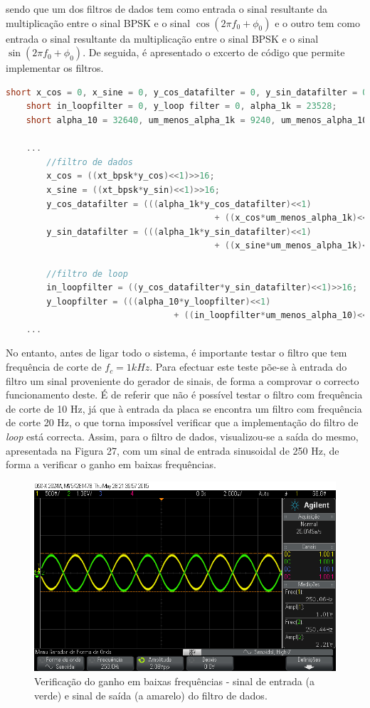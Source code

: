 \documentclass[11pt]{article}
\numberwithin{equation}{section}
\begin{document}
\vspace{1mm}
sendo que um dos filtros de dados tem como entrada o sinal resultante da multiplicação entre o sinal BPSK e o sinal $\cos(2\pi f_0 + \phi_0)$ e o outro tem como entrada o sinal resultante da multiplicação entre o sinal BPSK e o sinal $\sin(2\pi f_0 + \phi_0)$. De seguida, é apresentado o excerto de código que permite implementar os filtros. 

\begin{lstlisting}[language=C]
	short x_cos = 0, x_sine = 0, y_cos_datafilter = 0, y_sin_datafilter = 0;  
	short in_loopfilter = 0, y_loop filter = 0, alpha_1k = 23528; 
	short alpha_10 = 32640, um_menos_alpha_1k = 9240, um_menos_alpha_10 = 127;

	...
		//filtro de dados
		x_cos = ((xt_bpsk*y_cos)<<1)>>16;
		x_sine = ((xt_bpsk*y_sin)<<1)>>16;
		y_cos_datafilter = (((alpha_1k*y_cos_datafilter)<<1)
										 + ((x_cos*um_menos_alpha_1k)<<1))>>16;
		y_sin_datafilter = (((alpha_1k*y_sin_datafilter)<<1)
										 + ((x_sine*um_menos_alpha_1k)<<1))>>16;
	
		//filtro de loop
		in_loopfilter = ((y_cos_datafilter*y_sin_datafilter)<<1)>>16;
		y_loopfilter = (((alpha_10*y_loopfilter)<<1) 
								 + ((in_loopfilter*um_menos_alpha_10)<<1))>>16;
	...
\end{lstlisting}

No entanto, antes de ligar todo o sistema, é importante testar o filtro que tem frequência de corte de $f_c = 1 kHz$. Para efectuar este teste põe-se à entrada do filtro um sinal proveniente do gerador de sinais, de forma a comprovar o correcto funcionamento deste. É de referir que não é possível testar o filtro com frequência de corte de 10 Hz, já que à entrada da placa se encontra um filtro com frequência de corte 20 Hz, o que torna impossível verificar que a implementação do filtro de \textit{loop} está correcta. Assim, para o filtro de dados, visualizou-se a saída do mesmo, apresentada na Figura 27, com um sinal de entrada sinusoidal de 250 Hz, de forma a verificar o ganho em baixas frequências.

\begin{figure}[H]
	\centering
	\includegraphics[keepaspectratio=true, scale=0.35]{exps/filtro_1k_baixafreq}
	\caption{Verificação do ganho em baixas frequências - sinal de entrada (a verde) e sinal de saída (a amarelo) do filtro de dados.}
	\vspace{-0.8em}
\end{figure} 
\end{document}

